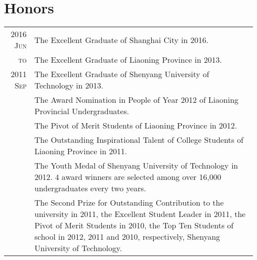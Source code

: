 \documentclass[a4paper,10pt]{article}
\begin{document}
\section{Honors}
\begin{longtable}[H]{r|p{13.5cm}}
  \textsc{2016 Jun} & The Excellent Graduate of Shanghai City in 2016. \\
  \textsc{to}& The Excellent Graduate of Liaoning Province in 2013. \\
  \textsc{2011 Sep} & The Excellent Graduate of Shenyang University of Technology in 2013. \\
                    & The Award Nomination in People of Year 2012 of Liaoning Provincial Undergraduates. \\
                    & The Pivot of Merit Students of Liaoning Province in 2012. \\
                    & The Outstanding Inspirational Talent of College Students of Liaoning Province in 2011. \\
                    & The Youth Medal of Shenyang University of Technology in 2012. 4 award winners are selected among over 16,000 undergraduates every two years. \\
                    & The {Second Prize for Outstanding Contribution} to the university in 2011, the {Excellent Student Leader} in 2011, the {Pivot of Merit Students} in 2010, the {Top Ten Students} of school in 2012, 2011 and 2010, respectively, Shenyang University of Technology.
\end{longtable}




\end{document}
